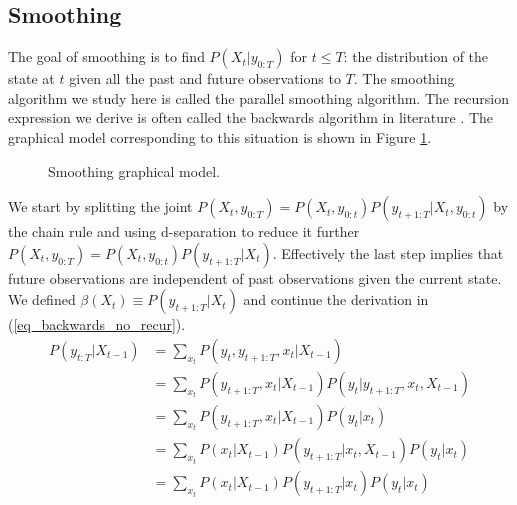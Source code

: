 \subsection{Smoothing}
The goal of smoothing is to find $P(X_t|y_{0:T})$ for $t\leq T$: the distribution of the state at $t$ given all the past and future observations to $T$. The smoothing algorithm we study here is called the parallel smoothing algorithm. The recursion expression we derive is often called the backwards algorithm in literature \cite{murphy1}. The graphical model corresponding to this situation is shown in Figure \ref{fig_linmod_smooth_hmm}.
\begin{figure}[H] 
\centering
{}
\caption{Smoothing graphical model.}
\label{fig_linmod_smooth_hmm}
\end{figure}
We start by splitting the joint $P(X_t, y_{0:T}) = P(X_t, y_{0:t})P(y_{t+1:T}|X_t,y_{0:t})$ by the chain rule and using d-separation to reduce it further $P(X_t, y_{0:T}) = P(X_t, y_{0:t})P(y_{t+1:T}|X_t)$. Effectively the last step implies that future observations are independent of past observations given the current state. We defined $\beta(X_t)\equiv P(y_{t+1:T}|X_t)$ and continue the derivation in (\ref{eq_backwards_no_recur}).
\begin{equation}
\begin{aligned}
P(y_{t:T}|X_{t-1}) &= \sum_{x_t} P(y_t, y_{t+1:T}, x_t|X_{t-1}) \\
&= \sum_{x_t} P(y_{t+1:T}, x_t | X_{t-1})P(y_t| y_{t+1:T}, x_t, X_{t-1}) \\
&= \sum_{x_t} P(y_{t+1:T}, x_t | X_{t-1})P(y_t| x_t) \\
&= \sum_{x_t} P(x_t | X_{t-1})P(y_{t+1:T}| x_t,X_{t-1})P(y_t| x_t) \\
&= \sum_{x_t} P(x_t | X_{t-1})P(y_{t+1:T}| x_t)P(y_t| x_t) \\
\end{aligned}
\label{eq_backwards_no_recur}
\end{equation}
